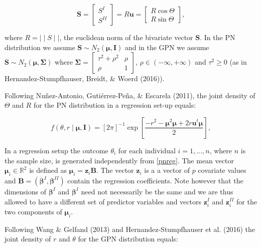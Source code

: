 \documentclass[11pt,]{article}
\begin{document}
\begin{equation}\label{projection}
\boldsymbol{S} = \begin{bmatrix} S^{I} \\ S^{II} \end{bmatrix} = R\boldsymbol{u} = \begin{bmatrix} R \cos \Theta \\  R\sin \Theta \end{bmatrix},
\end{equation}

where \(R = \mid\mid S \mid\mid\), the euclidean norm of the bivariate
vector \(\boldsymbol{S}\). In the PN distribution we assume
\(\boldsymbol{S} \sim N_2(\boldsymbol{\mu}, \boldsymbol{I})\) and in the
GPN we assume
\(\boldsymbol{S} \sim N_2(\boldsymbol{\mu}, \boldsymbol{\Sigma})\) where
\(\boldsymbol{\Sigma} = \begin{bmatrix} \tau^2 + \rho^2 & \rho\\ \rho & 1 \end{bmatrix}\),
\(\rho \in (-\infty, +\infty)\) and \(\tau^2 \geq 0\) (as in
Hernandez-Stumpfhauser, Breidt, \& Woerd (2016)).

Following Nuñez-Antonio, Gutiérrez-Peña, \& Escarela (2011), the joint
density of \(\Theta\) and \(R\) for the PN distribution in a regression
set-up equals:

\begin{equation}\label{pnreg}
f(\theta,r \mid \boldsymbol{\mu}, \boldsymbol{I}) = [2\pi]^{-1} \exp\left[ \frac{-r^2 - \boldsymbol{\mu}^2\boldsymbol{\mu} + 2r\boldsymbol{u}^t\boldsymbol{\mu}}{2}\right],
\end{equation}

In a regression setup the outcome \(\theta_i\) for each individual
\(i = 1, \dots, n\), where \(n\) is the sample size, is generated
independently from \eqref{pnreg}. The mean vector
\(\boldsymbol{\mu}_i \in \mathbb{R}^2\) is defined as
\(\boldsymbol{\mu}_i = \boldsymbol{z}_i\boldsymbol{B}\). The vector
\(\boldsymbol{z}_i\) is a a vector of \(p\) covariate values and
\(\boldsymbol{B} = (\boldsymbol{\beta}^{I}, \boldsymbol{\beta}^{II})\)
contain the regression coefficients. Note however that the dimensions of
\(\boldsymbol{\beta}^{I}\) and \(\boldsymbol{\beta }^{I}\) need not
necessarily be the same and we are thus allowed to have a different set
of predictor variables and vectors \(\boldsymbol{z}_i^I\) and
\(\boldsymbol{z}_i^{II}\) for the two components of
\(\boldsymbol{\mu}_i\).

Following Wang \& Gelfand (2013) and Hernandez-Stumpfhauser et al.
(2016) the joint density of \(r\) and \(\theta\) for the GPN
distribution equals:
\end{document}
